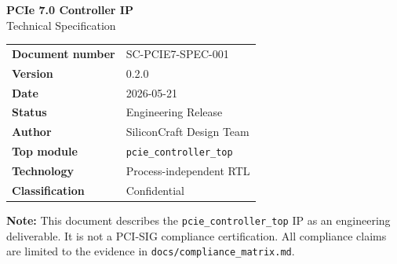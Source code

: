 \documentclass[11pt,a4paper]{article}
\begin{document}
\begin{titlepage}

  \vspace*{20mm}
  {\color{white}\fontsize{28}{34}\selectfont\bfseries PCIe 7.0 Controller IP}\\[4mm]
  {\color{white!80!scblue}\fontsize{16}{20}\selectfont Technical Specification}

  \vspace{40mm}

  \begin{tabular}{ll}
    \textbf{Document number} & SC-PCIE7-SPEC-001 \\[2mm]
    \textbf{Version}         & 0.2.0 \\[2mm]
    \textbf{Date}            & 2026-05-21 \\[2mm]
    \textbf{Status}          & Engineering Release \\[2mm]
    \textbf{Author}          & SiliconCraft Design Team \\[2mm]
    \textbf{Top module}      & \texttt{pcie\_controller\_top} \\[2mm]
    \textbf{Technology}      & Process-independent RTL \\[2mm]
    \textbf{Classification}  & Confidential \\
  \end{tabular}

  \vfill

  \begin{notebox}
    \textbf{Note:} This document describes the \texttt{pcie\_controller\_top} IP as
    an engineering deliverable. It is not a PCI-SIG compliance certification.
    All compliance claims are limited to the evidence in \texttt{docs/compliance\_matrix.md}.
  \end{notebox}
\end{titlepage}

\newpage
\end{document}
